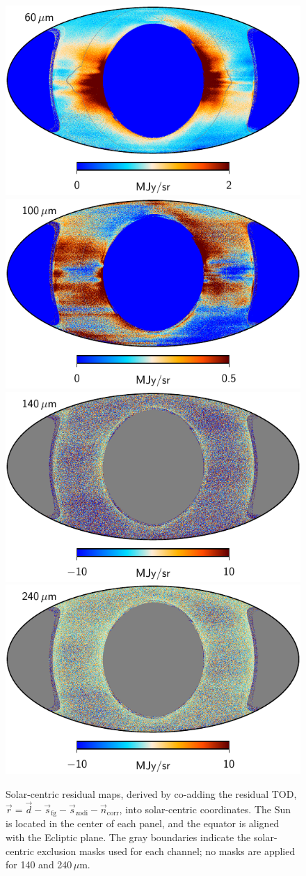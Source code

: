 \documentclass{aa}
\newcommand{\dv}[0]{\vec{d}}
\newcommand{\n}[0]{\vec{n}}
\newcommand{\s}[0]{\vec{s}}
\renewcommand{\r}[0]{\vec{r}}
\begin{document}
\begin{figure}
  \includegraphics[width=0.40\linewidth]{figs/solarmap_07_v1.pdf}\hspace*{5mm}
  \includegraphics[width=0.40\linewidth]{figs/solarmap_08_v1.pdf}\\
  \includegraphics[width=0.40\linewidth]{figs/solarmap_09_v1.pdf}\hspace*{5mm}
  \includegraphics[width=0.40\linewidth]{figs/solarmap_10_v1.pdf}
  \caption{Solar-centric residual maps, derived by co-adding the residual TOD, $\r = \dv - \s_{\mathrm{fg}} - \s_{\mathrm{zodi}} - \n_{\mathrm{corr}}$, into solar-centric coordinates. The Sun is located in the center of each panel, and the equator is aligned with the Ecliptic plane. The gray boundaries indicate the solar-centric exclusion masks used for each channel; no masks are applied for 140 and 240\,$\mu$m. }
  \label{fig:solarmaps}
\end{figure}



\end{document}
